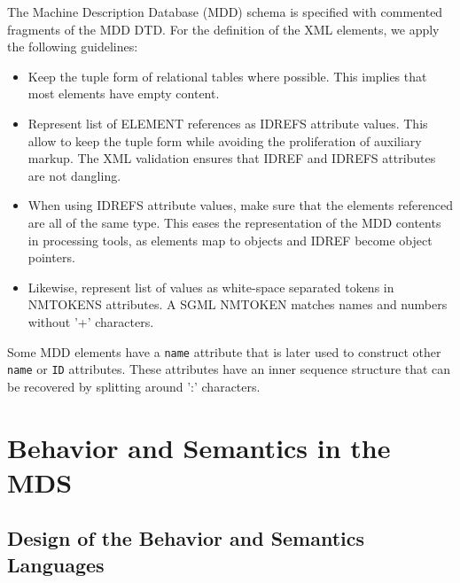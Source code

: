 \documentclass[11pt,a4paper]{article}
\begin{document}
The Machine Description Database (MDD) schema is specified with commented
fragments of the MDD DTD. For the definition of the XML elements, we apply the
following guidelines: \begin{itemize}

\item Keep the tuple form of relational tables where possible. This implies that
most elements have empty content.

\item Represent list of ELEMENT references as IDREFS attribute values. This
allow to keep the tuple form while avoiding the proliferation of auxiliary
markup. The XML validation ensures that IDREF and IDREFS attributes are not
dangling.

\item When using IDREFS attribute values, make sure that the elements referenced
are all of the same type. This eases the representation of the MDD contents in
processing tools, as elements map to objects and IDREF become object pointers.

\item Likewise, represent list of values as white-space separated tokens in
NMTOKENS attributes. A SGML NMTOKEN matches names and numbers without '+'
characters.

\end{itemize} 

Some MDD elements have a \texttt{name} attribute that is later used to construct
other \texttt{name} or \texttt{ID} attributes. These attributes have an inner
sequence structure that can be recovered by splitting around ':' characters.




\section{Behavior and Semantics in the MDS}

\subsection{Design of the Behavior and Semantics Languages}
\end{document}
